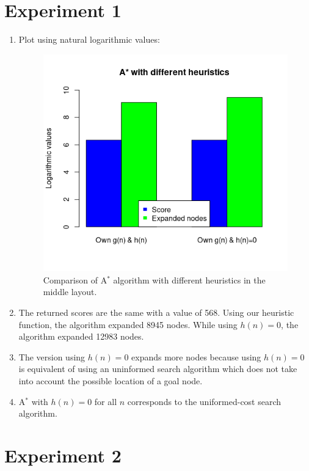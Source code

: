 \documentclass{article}
\begin{document}
\section{Experiment 1}

\begin{enumerate}[label=\alph*.,leftmargin=1.35em]
    \item Plot using natural logarithmic values:\\
    \begin{figure}[H]
        \centering
        \includegraphics[scale=0.7]{q3_plot.png} 
        \caption{Comparison of A$^*$ algorithm with different heuristics in the middle layout.}
    \end{figure}
    \item The returned scores are the same with a value of 568. Using our heuristic function, the algorithm expanded 8945 nodes. While using $h(n)=0$, the algorithm expanded 12983 nodes.
    \item The version using $h(n) = 0$ expands more nodes because using $h(n) = 0$ is equivalent of using an uninformed search algorithm which does not take into account the possible location of a goal node.
    \item A$^*$ with $h(n) = 0$ for all $n$ corresponds to the uniformed-cost search algorithm.
\end{enumerate}

\section{Experiment 2}
\end{document}
